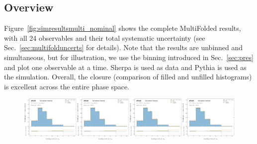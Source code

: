 \label{sec:resultsMulti}

\subsection{Overview}

Figure~\ref{fig:simresultsmulti_nominal} shows the complete MultiFolded results, with all 24 observables and their total systematic uncertainty (see Sec.~\ref{sec:multifolduncerts} for details).  Note that the results are unbinned and simultaneous, but for illustration, we use the binning introduced in Sec.~\ref{sec:pres} and plot one observable at a time.  Sherpa is used as data and Pythia is used as the simulation.  Overall, the closure (comparison of filled and unfilled histograms) is excellent across the entire phase space.

\begin{figure}[h!]
\centering
\includegraphics[width=0.25\textwidth,page=1]{figures/SimResults/TotalErrors.pdf}\includegraphics[width=0.25\textwidth,page=2]{figures/SimResults/TotalErrors.pdf}\includegraphics[width=0.25\textwidth,page=3]{figures/SimResults/TotalErrors.pdf}\includegraphics[width=0.25\textwidth,page=4]{figures/SimResults/TotalErrors.pdf}\\

\end{figure}
